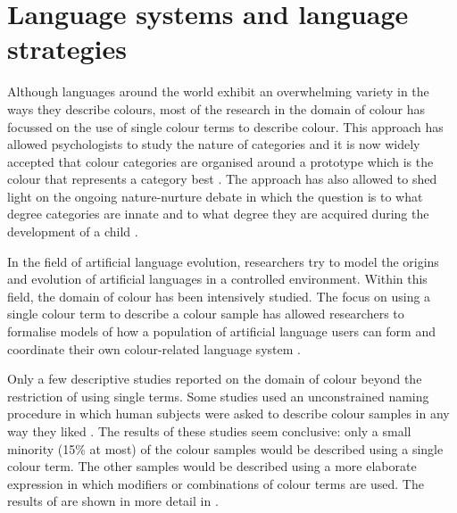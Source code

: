 \chapter{Language systems and language strategies}

Although languages around the world exhibit an overwhelming variety in
the ways they describe colours, most of the research in the domain of
colour has focussed on the use of single colour terms to describe
colour. This approach has allowed psychologists to study the nature of
categories and it is now widely accepted that colour categories are organised around a
prototype which is the colour that represents a category best
\citep{rosch73natural}. The approach has also allowed to shed light
on the ongoing nature-nurture debate in which the question is to what
degree categories are innate and to what degree they are acquired
during the development of a child \citep{berlin69basic}.

In the field of artificial language evolution, researchers try to
model the origins and evolution of artificial languages in a
controlled environment. Within this field, the domain of colour has
been intensively studied. The focus on using a single colour term to
describe a colour sample has allowed researchers to formalise models
of how a population of artificial language users can form and
coordinate their own colour-related language system
\citep{steels05coordinating, belpaeme05explaining, belpaeme07language,
  puglisi08cultural, baronchelli10modeling}.

Only a few descriptive studies reported on the domain of colour beyond
the restriction of using single terms. Some studies used an
unconstrained naming procedure in which human subjects were asked to
describe colour samples in any way they liked \citep{simpson91sex,
  lin01unconstrained}. The results of these studies seem conclusive:
only a small minority (15\% at most) of the colour samples would be
described using a single colour term. The other samples would be
described using a more elaborate expression in which modifiers or
combinations of colour terms are used. The results of
\citet{lin01unconstrained} are shown in more detail in .

